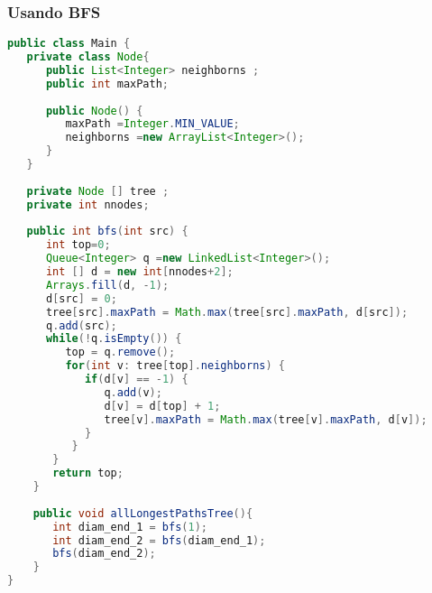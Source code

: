 \subsubsection{Usando BFS}
\begin{lstlisting}[language=Java]
public class Main {
   private class Node{
      public List<Integer> neighborns ;
      public int maxPath;
			
      public Node() {
         maxPath =Integer.MIN_VALUE;
         neighborns =new ArrayList<Integer>();
      }
   }
		
   private Node [] tree ;
   private int nnodes;
		
   public int bfs(int src) {
      int top=0;
      Queue<Integer> q =new LinkedList<Integer>();
      int [] d = new int[nnodes+2];
      Arrays.fill(d, -1);
      d[src] = 0;
      tree[src].maxPath = Math.max(tree[src].maxPath, d[src]);
      q.add(src);
      while(!q.isEmpty()) {
         top = q.remove();
         for(int v: tree[top].neighborns) {
            if(d[v] == -1) {
               q.add(v);
               d[v] = d[top] + 1;
               tree[v].maxPath = Math.max(tree[v].maxPath, d[v]);
            }
          }
       }
       return top;
    }
		
    public void allLongestPathsTree(){
       int diam_end_1 = bfs(1);
       int diam_end_2 = bfs(diam_end_1);
       bfs(diam_end_2);
    }
}
\end{lstlisting}
